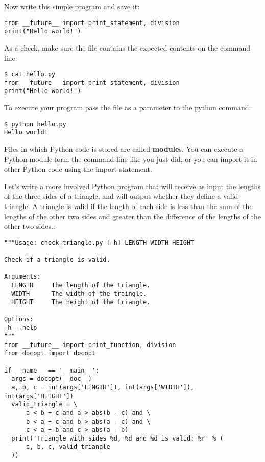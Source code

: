 Now write this simple program and save it:

\begin{lstlisting}
from __future__ import print_statement, division
print("Hello world!")
\end{lstlisting}

As a check, make sure the file contains the expected contents on the
command line:

\begin{lstlisting}
$ cat hello.py
from __future__ import print_statement, division
print("Hello world!")
\end{lstlisting}

To execute your program pass the file as a parameter to the python
command:

\begin{lstlisting}
$ python hello.py
Hello world!
\end{lstlisting}

Files in which Python code is stored are called \textbf{module}s. You
can execute a Python module form the command line like you just did, or
you can import it in other Python code using the import statement.

Let's write a more involved Python program that will receive as input
the lengths of the three sides of a triangle, and will output whether
they define a valid triangle. A triangle is valid if the length of each
side is less than the sum of the lengths of the other two sides and
greater than the difference of the lengths of the other two sides.:

\begin{lstlisting}
"""Usage: check_triangle.py [-h] LENGTH WIDTH HEIGHT

Check if a triangle is valid.

Arguments:
  LENGTH     The length of the triangle.
  WIDTH      The width of the traingle.
  HEIGHT     The height of the triangle.

Options:
-h --help
"""
from __future__ import print_function, division
from docopt import docopt

if __name__ == '__main__':
  args = docopt(__doc__)
  a, b, c = int(args['LENGTH']), int(args['WIDTH']), int(args['HEIGHT'])
  valid_triangle = \
      a < b + c and a > abs(b - c) and \
      b < a + c and b > abs(a - c) and \
      c < a + b and c > abs(a - b)
  print('Triangle with sides %d, %d and %d is valid: %r' % (
      a, b, c, valid_triangle
  ))
\end{lstlisting}

